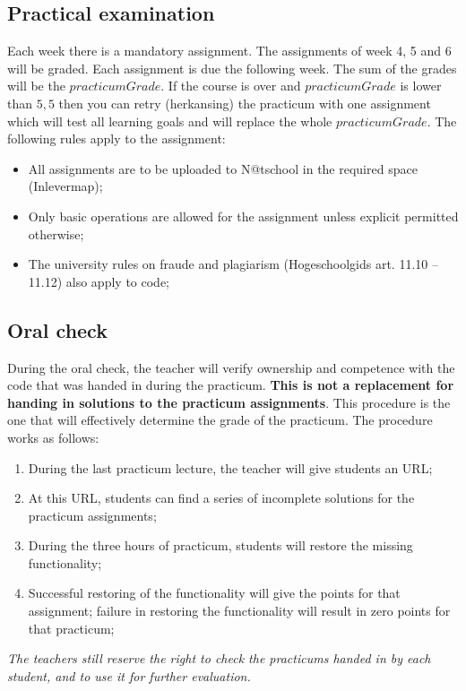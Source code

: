 \subsection{Practical examination \modulecode}
Each week there is a mandatory assignment. The assignments of week 4, 5 and 6 will be graded. Each assignment is due the following week. The sum of the grades will be the $practicumGrade$. 
If the course is over and $practicumGrade$ is lower than $5,5$ then you can retry (herkansing) the practicum with one assignment which will test all learning goals and will replace the whole $practicumGrade$.
The following rules apply to the assignment:
\begin{itemize}
  \item All assignments are to be uploaded to N@tschool in the required space (Inlevermap);
  \item Only basic operations are allowed for the assignment unless explicit permitted otherwise;
  \item The university rules on fraude and plagiarism (Hogeschoolgids art. 11.10 -- 11.12) also apply to code;
\end{itemize}



\subsection{Oral check \modulecode}
During the oral check, the teacher will verify ownership and competence with the code that was handed in during the practicum. \textbf{This is not a replacement for handing in solutions to the practicum assignments}. This procedure is the one that will effectively determine the grade of the practicum. The procedure works as follows:

\begin{enumerate}
\item During the last practicum lecture, the teacher will give students an URL;
\item At this URL, students can find a series of incomplete solutions for the practicum assignments;
\item During the three hours of practicum, students will restore the missing functionality;
\item Successful restoring of the functionality will give the points for that assignment; failure in restoring the functionality will result in zero points for that practicum;
\end{enumerate}

\textit{The teachers still reserve the right to check the practicums handed in by each student, and to use it for further evaluation.}
